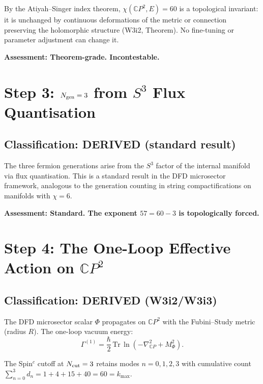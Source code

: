 \documentclass[11pt,a4paper]{article}
\newcommand{\CP}{\mathbb{C}P}
\begin{document}
By the Atiyah--Singer index theorem, $\chi(\CP^2, E) = 60$ is a
topological invariant: it is unchanged by continuous deformations of
the metric or connection preserving the holomorphic structure (W3i2,
Theorem). No fine-tuning or parameter adjustment can change it.

\textbf{Assessment: Theorem-grade. Incontestable.}

\section{Step 3: $N_{\rm gen} = 3$ from $S^3$ Flux Quantisation}
\label{sec:step3}

\subsection{Classification: DERIVED (standard result)}

The three fermion generations arise from the $S^3$ factor of the
internal manifold via flux quantisation. This is a standard result
in the DFD microsector framework, analogous to the generation counting
in string compactifications on manifolds with $\chi = 6$.

\textbf{Assessment: Standard. The exponent $57 = 60 - 3$ is
topologically forced.}

\section{Step 4: The One-Loop Effective Action on $\CP^2$}
\label{sec:step4}

\subsection{Classification: DERIVED (W3i2/W3i3)}

The DFD microsector scalar $\Phi$ propagates on $\CP^2$ with the
Fubini--Study metric (radius $R$). The one-loop vacuum energy:
\begin{equation}
\Gamma^{(1)} = \frac{\hbar}{2}\,\mathrm{Tr}\,\ln(-\nabla_{\CP}^2
+ M_\Phi^2).
\end{equation}

The Spin$^c$ cutoff at $N_{\rm cut} = 3$ retains modes $n = 0,1,2,3$
with cumulative count $\sum_{n=0}^3 d_n = 1 + 4 + 15 + 40 = 60 =
k_{\max}$.
\end{document}
